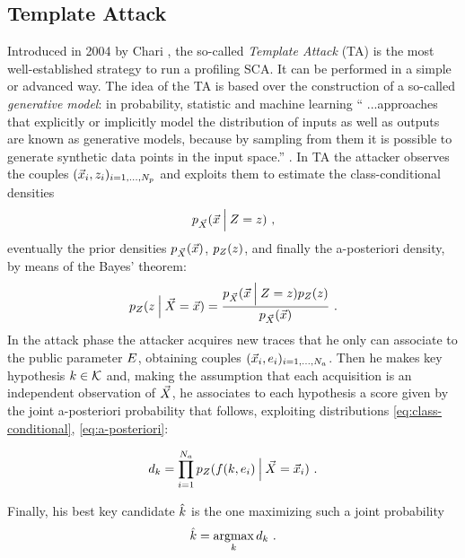 \subsection{Template Attack}\label{sec:TA}
Introduced in 2004 by Chari \cite{Chari2003}, the so-called \emph{Template Attack} (TA) is the most well-established strategy to run a profiling SCA. It can be performed in a simple or advanced way. The idea of the TA is based over the construction of a so-called \emph{generative model}: in probability, statistic and machine learning \enquote{ ...approaches that explicitly or implicitly model the distribution of inputs as well as outputs are known as generative models, because by sampling from them it is possible to generate synthetic data points in the input space.} \cite{christopher2006pattern}.
In TA the attacker observes the couples $(\vec{x}_i, z_i)_{i=1, \dots , N_p}$  and exploits them to estimate the class-conditional densities  
\begin{equation}\label{eq:class-conditional}
p_{\vec{X}}(\vec{x} \:\Big\vert\: Z = z)\mbox{ ,}
\end{equation}
eventually the prior densities $p_{\vec{X}}(\vec{x})$, $p_{Z}(z)$, and finally the a-posteriori density, by means of the Bayes' theorem:
\begin{equation}\label{eq:a-posteriori}
p_{Z}(z \:\Big\vert\: \vec{X} = \vec{x}) = \frac{p_{\vec{X}}(\vec{x} \:\Big\vert\: Z = z)p_{Z}(z)} {p_{\vec{X}}(\vec{x})}\mbox{ .}
\end{equation}
In the attack phase the attacker acquires new traces that he only can associate to the public parameter $E$, obtaining couples  $(\vec{x}_i, e_i)_{i=1, \dots , N_a}$. Then he makes key hypothesis $k \in \mathcal{K}$ and, making the assumption that each acquisition is an independent observation of $\vec{X}$, he associates to each hypothesis a score given by the joint a-posteriori probability that follows, exploiting distributions \eqref{eq:class-conditional}, \eqref{eq:a-posteriori}:

\begin{equation}\label{eq:joint_distr}
d_{k} = \prod_{i=1}^{N_a} p_{Z}(f(k,e_i) \:\Big\vert\: \vec{X} = \vec{x}_i) \mbox{ .}
\end{equation}

Finally, his best key candidate $\hat{k}$ is the one maximizing such a joint probability
\begin{equation}\label{eq:max_classifier}
\hat{k} = \operatorname*{argmax}_{k} d_{k} \mbox{ .}
\end{equation}

